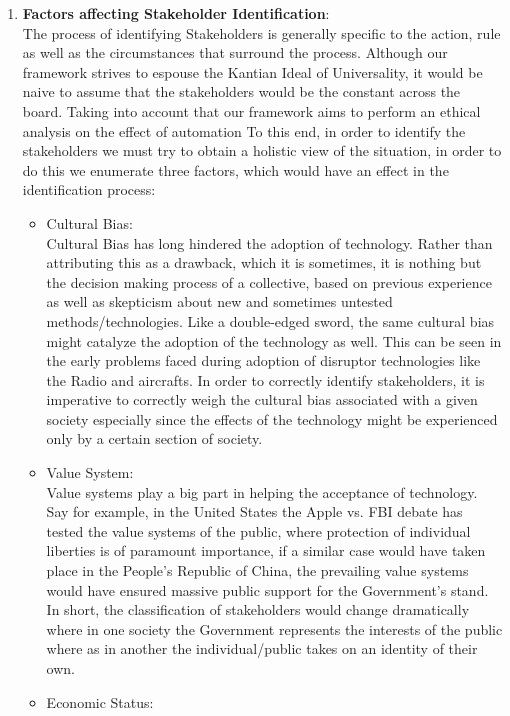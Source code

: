 \begin{enumerate}[a]
\item \textbf{Factors affecting Stakeholder Identification}:\\
The process of identifying Stakeholders is generally specific to the action, rule as well as the circumstances that surround the process. Although our framework strives to espouse the Kantian Ideal of Universality, it would be naive to assume that the stakeholders would be the constant across the board. Taking into account that our framework aims to perform an ethical analysis on the effect of automation
To this end, in order to identify the stakeholders we must try to obtain a holistic view of the situation, in order to do this we enumerate three factors, which would have an effect in the identification process:\\
\begin{itemize}
\item Cultural Bias:\\
Cultural Bias has long hindered the adoption of technology. Rather than attributing this as a drawback, which it is sometimes, it is nothing but the decision making process of a collective, based on previous experience as well as skepticism about new and sometimes untested methods/technologies. Like a double-edged sword, the same cultural bias might catalyze the adoption of the technology as well. This can be seen in the early problems faced during adoption of disruptor technologies like the Radio and aircrafts. In order to correctly identify stakeholders, it is imperative to correctly weigh the cultural bias associated with a given society especially since the effects of the technology might be experienced only by a certain section of society.
\item  Value System:\\
Value systems play a big part in helping the acceptance of technology. Say for example, in the United States the Apple vs. FBI debate has tested the value systems of the public, where protection of individual liberties is of paramount importance, if a similar case would have taken place in the People's Republic of China, the prevailing value systems would have ensured massive public support for the Government's stand.\\
In short, the classification of stakeholders would change dramatically where in one society the Government represents the interests of the public where as in another the individual/public takes on an identity of their own.
\item Economic Status:\\

\end{itemize}
\end{enumerate}
